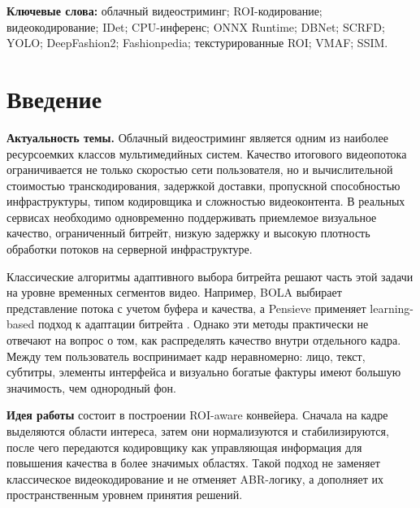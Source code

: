 \documentclass[12pt,a4paper,oneside,openany]{report}
\newcommand{\important}[1]{\textbf{#1}}
\begin{document}
\textbf{Ключевые слова:} облачный видеостриминг; ROI-кодирование; видеокодирование; IDet; CPU-инференс; ONNX Runtime; DBNet; SCRFD; YOLO; DeepFashion2; Fashionpedia; текстурированные ROI; VMAF; SSIM.


\clearpage
\tableofcontents
\clearpage


\chapter*{Введение}

\important{Актуальность темы.} Облачный видеостриминг является одним из наиболее ресурсоемких классов мультимедийных систем. Качество итогового видеопотока ограничивается не только скоростью сети пользователя, но и вычислительной стоимостью транскодирования, задержкой доставки, пропускной способностью инфраструктуры, типом кодировщика и сложностью видеоконтента. В реальных сервисах необходимо одновременно поддерживать приемлемое визуальное качество, ограниченный битрейт, низкую задержку и высокую плотность обработки потоков на серверной инфраструктуре.

Классические алгоритмы адаптивного выбора битрейта решают часть этой задачи на уровне временных сегментов видео. Например, BOLA выбирает представление потока с учетом буфера и качества, а Pensieve применяет learning-based подход к адаптации битрейта \cite{bola,pensieve}. Однако эти методы практически не отвечают на вопрос о том, как распределять качество внутри отдельного кадра. Между тем пользователь воспринимает кадр неравномерно: лицо, текст, субтитры, элементы интерфейса и визуально богатые фактуры имеют большую значимость, чем однородный фон.

\important{Идея работы} состоит в построении ROI-aware конвейера. Сначала на кадре выделяются области интереса, затем они нормализуются и стабилизируются, после чего передаются кодировщику как управляющая информация для повышения качества в более значимых областях. Такой подход не заменяет классическое видеокодирование и не отменяет ABR-логику, а дополняет их пространственным уровнем принятия решений.
\end{document}
